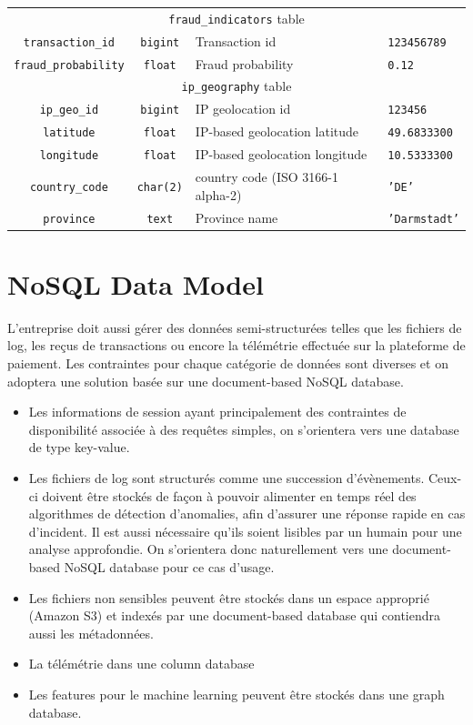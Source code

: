 \documentclass[11pt,a4paper,computermodern]{article}
\newcommand{\code}{\texttt}
\begin{document}
\begin{table}[ht]
\begin{threeparttable}
\begin{tabularx}{0.99\textwidth}{c c >{\centering\arraybackslash}X >{\centering\arraybackslash}X}
			\midrule
			\multicolumn{4}{c}{\code{fraud\_indicators} table}\\
			\code{transaction\_id} & \code{bigint} & Transaction id & \code{123456789} \\
			\code{fraud\_probability} & \code{float} & Fraud probability & \code{0.12} \\
			
			\midrule
			\multicolumn{4}{c}{\code{ip\_geography} table}\\
			\code{ip\_geo\_id} & \code{bigint} & IP geolocation id & \code{123456} \\
			\code{latitude} & \code{float} & IP-based geolocation latitude & \code{49.6833300} \\
			\code{longitude} & \code{float} & IP-based geolocation longitude & \code{10.5333300} \\
			\code{country\_code} & \code{char(2)} & country code (ISO 3166-1 alpha-2) & \code{'DE'} \\
			\code{province} & \code{text} & Province name & \code{'Darmstadt'} \\
			
			\bottomrule
		\end{tabularx}
	\end{threeparttable}
\end{table}


\section*{NoSQL Data Model}

L'entreprise doit aussi gérer des données semi-structurées telles que les fichiers de log, les reçus de transactions ou encore la télémétrie effectuée sur la plateforme de paiement. Les contraintes pour chaque catégorie de données sont diverses et on adoptera une solution basée sur une document-based NoSQL database.

\begin{itemize}
	\item Les informations de session ayant principalement des contraintes de disponibilité associée à des requêtes simples, on s'orientera vers une database de type key-value.
	\item Les fichiers de log sont structurés comme une succession d'évènements. Ceux-ci doivent être stockés de façon à pouvoir alimenter en temps réel des algorithmes de détection d'anomalies, afin d'assurer une réponse rapide en cas d'incident. Il est aussi nécessaire qu'ils soient lisibles par un humain pour une analyse approfondie. On s'orientera donc naturellement vers une document-based NoSQL database pour ce cas d'usage.
	\item Les fichiers non sensibles peuvent être stockés dans un espace approprié (Amazon S3) et indexés par une document-based database qui contiendra aussi les métadonnées.
	\item La télémétrie dans une column database
	\item Les features pour le machine learning peuvent être stockés dans une graph database.
\end{itemize}
\end{document}
